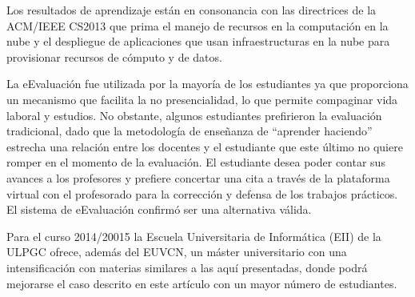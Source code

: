 \documentclass[conference]{IEEEtran}
\begin{document}
Los resultados de aprendizaje están en consonancia con las directrices de la ACM/IEEE CS2013 
que prima el manejo de recursos en la computación en la nube y el despliegue de aplicaciones 
que usan infraestructuras en la nube para provisionar recursos de cómputo y de datos.

La eEvaluación fue utilizada por la mayoría de los estudiantes ya que proporciona un mecanismo que 
facilita la no presencialidad, lo que permite compaginar vida laboral y estudios. No obstante, 
algunos estudiantes prefirieron la evaluación tradicional, dado que la metodología de enseñanza 
de ``aprender haciendo'' estrecha una relación entre los docentes y el estudiante que este último 
no quiere romper en el momento de la evaluación. El estudiante desea poder contar sus avances a 
los profesores y prefiere concertar una cita a través de la plataforma virtual con el profesorado 
para la corrección y defensa de los trabajos prácticos. El sistema de eEvaluación confirmó ser una 
alternativa válida.

Para el curso 2014/20015 la Escuela Universitaria de Informática (EII) de la ULPGC ofrece, además 
del EUVCN, un máster universitario con una intensificación con materias similares a las aquí presentadas,
donde podrá mejorarse el caso descrito en este artículo con un mayor número de estudiantes.

 



                                                            




 













\end{document}
